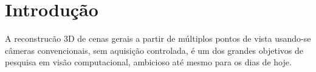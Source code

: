 \documentclass[table, usenames, svgnames, xcolor=dvipsnames]{beamer}
\begin{document}

\begin{frame}

	\footnotesize{ \tableofcontents[hideallsubsections] }
\end{frame}


\section{Introdução}
\begin{frame} 
A reconstrucão 3D de cenas gerais a partir de múltiplos pontos de vista usando-se
câmeras convencionais, sem aquisição controlada, é um dos grandes objetivos de pesquisa
em visão computacional, ambicioso até mesmo para os dias de hoje. 


\end{frame}
\end{document}
